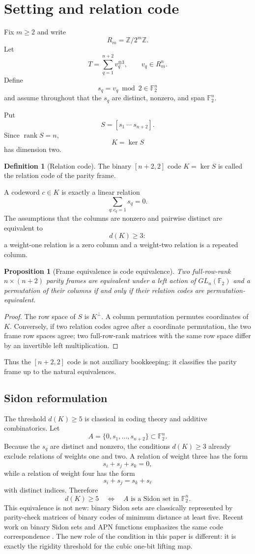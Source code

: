 \documentclass[11pt]{article}
\newtheorem{proposition}[theorem]{Proposition}
\theoremstyle{definition}
\newtheorem{definition}[theorem]{Definition}
\newcommand{\F}{\mathbb F}
\newcommand{\Z}{\mathbb Z}
\newcommand{\rank}{\operatorname{rank}}
\begin{document}
\section{Setting and relation code}
Fix \(m\ge2\) and write
\[
R_m=\Z/2^m\Z.
\]
Let
\[
T=\sum_{q=1}^{n+2}v_q^{\otimes3},
\qquad
v_q\in R_m^n.
\]
Define
\[
s_q=v_q\bmod2\in\F_2^n
\]
and assume throughout that the \(s_q\) are distinct, nonzero, and span \(\F_2^n\).

Put
\[
S=[s_1\ \cdots\ s_{n+2}].
\]
Since \(\rank S=n\),
\[
K=\ker S
\]
has dimension two.

\begin{definition}[Relation code]
The binary \([n+2,2]\) code \(K=\ker S\) is called the relation code of the parity frame.
\end{definition}

A codeword \(c\in K\) is exactly a linear relation
\[
\sum_{q:c_q=1}s_q=0.
\]
The assumptions that the columns are nonzero and pairwise distinct are equivalent to
\[
d(K)\ge3:
\]
a weight-one relation is a zero column and a weight-two relation is a repeated column.

\begin{proposition}[Frame equivalence is code equivalence]\label{prop:equiv}
Two full-row-rank \(n\times(n+2)\) parity frames are equivalent under a left action of \(GL_n(\F_2)\) and a permutation of their columns if and only if their relation codes are permutation-equivalent.
\end{proposition}

\begin{proof}
The row space of \(S\) is \(K^\perp\). A column permutation permutes coordinates of \(K\). Conversely, if two relation codes agree after a coordinate permutation, the two frame row spaces agree; two full-row-rank matrices with the same row space differ by an invertible left multiplication.
\end{proof}

Thus the \([n+2,2]\) code is not auxiliary bookkeeping: it classifies the parity frame up to the natural equivalences.

\subsection{Sidon reformulation}
The threshold \(d(K)\ge5\) is classical in coding theory and additive combinatorics. Let
\[
A=\{0,s_1,\ldots,s_{n+2}\}\subset\F_2^n.
\]
Because the \(s_q\) are distinct and nonzero, the conditions \(d(K)\ge3\) already exclude relations of weights one and two. A relation of weight three has the form
\[
s_i+s_j+s_k=0,
\]
while a relation of weight four has the form
\[
s_i+s_j=s_k+s_\ell
\]
with distinct indices. Therefore
\[
\boxed{
d(K)\ge5
\quad\Longleftrightarrow\quad
A\text{ is a Sidon set in }\F_2^n.
}
\]
This equivalence is not new: binary Sidon sets are classically represented by parity-check matrices of binary codes of minimum distance at least five. Recent work on binary Sidon sets and APN functions emphasizes the same code correspondence \cite{Nagy2025,CzerwinskiPott2026}. The new role of the condition in this paper is different: it is exactly the rigidity threshold for the cubic one-bit lifting map.
\end{document}
